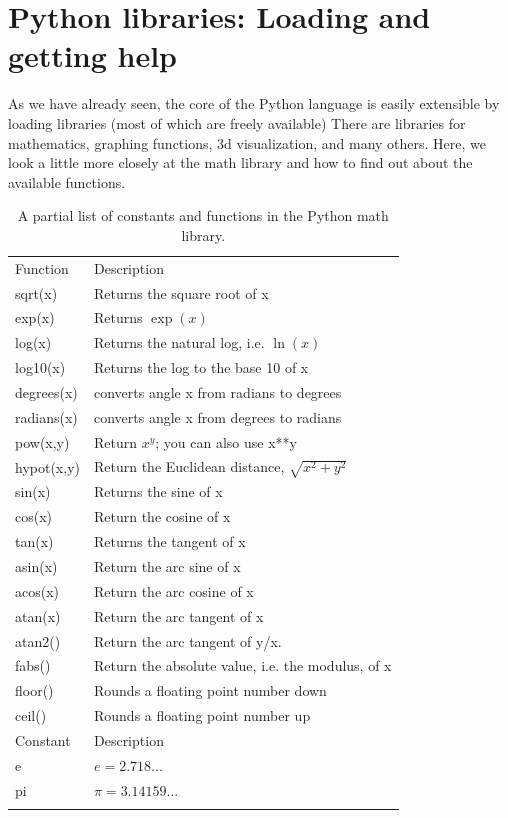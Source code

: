 \section{Python libraries: Loading and getting help}
\label{sec:mathlibrary}
As we have already seen, the core of the Python language is easily extensible by loading libraries (most of which are freely available) There are libraries for mathematics, graphing functions, 3d visualization, and many others. Here, we look a little more closely at the math library and how to find out about the available functions. 
%
%
\begin{table}
\centering
\caption{A partial list of constants and functions in the Python math library.}
\label{tab:mathlibrary}       %
\begin{tabular}{ll}
\hline\noalign{\smallskip}
Function\hspace*{7mm} & Description  \\
\noalign{\smallskip}\hline\noalign{\smallskip}
sqrt(x) 		&	Returns the square root of x\\
exp(x)		&	Returns $\exp(x)$ \\
log(x)		&	Returns the natural log, i.e. $\ln(x)$\\
log10(x)	&	Returns the log to the base 10 of x \\
degrees(x)	&	converts angle x from radians to degrees\\
radians(x) 	&	converts angle x from degrees to radians\\
pow(x,y)	&	Return $x^y$; you can also use x**y  \\
hypot(x,y)	&	Return the Euclidean distance, $\sqrt{x^2 + y^2}$\\
sin(x)		&	Returns the sine of x\\
cos(x)		&	Return the cosine of x\\
tan(x)		&	Returns the tangent of x\\
asin(x)		&	Return the arc sine of x\\
acos(x)		&	Return the arc cosine of x\\
atan(x)		&	Return the arc tangent of x\\
atan2()		&   Return the arc tangent of y/x.\\
fabs()		&   Return the absolute value, i.e. the modulus, of x\\
floor()		&   Rounds a floating point number down\\
ceil()		&	Rounds a floating point number up\\
\noalign{\smallskip}\hline\noalign{\smallskip}
Constant 	& 	Description  \\
\noalign{\smallskip}\hline\noalign{\smallskip}
e			& 	$e=2.718...$\\
pi			&	$\pi=3.14159...$\\
\noalign{\smallskip}\hline
\end{tabular}
\end{table}
%

